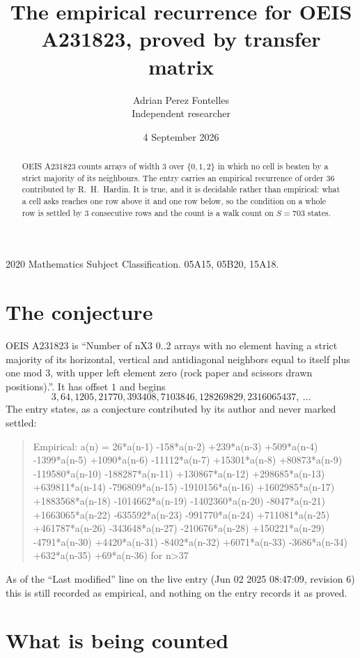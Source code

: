 \documentclass[11pt,a4paper]{article}
\title{The empirical recurrence for OEIS A231823, proved by transfer matrix}
\author{Adrian Perez Fontelles\\ \small Independent researcher}
\date{4 September 2026}
\theoremstyle{plain}
\theoremstyle{definition}
\begin{document}
\maketitle

\begin{abstract}
OEIS A231823 counts arrays of width $3$ over $\{0,1,2\}$ in which no cell is beaten by a strict majority of its neighbours. The entry carries an
empirical recurrence of order $36$ contributed by R.~H.~Hardin. It is true, and it is
decidable rather than empirical: what a cell asks reaches one row above
it and one row below, so the condition on a whole row is settled by
$3$ consecutive rows and the count is a walk count on $S=703$ states.
\end{abstract}

\noindent\small 2020 Mathematics Subject Classification. 05A15, 05B20, 15A18.\normalsize

\section{The conjecture}

OEIS A231823 is ``Number of nX3 0..2 arrays with no element having a strict majority of its horizontal, vertical and antidiagonal neighbors equal to itself plus one mod 3, with upper left element zero (rock paper and scissors drawn positions).''. It has offset $1$ and begins
\[
3, 64, 1205, 21770, 393408, 7103846, 128269829, 2316065437,\ \dots
\]
The entry states, as a conjecture contributed by its author and never marked settled:
\begin{quote}
Empirical: a(n) = 26*a(n-1) -158*a(n-2) +239*a(n-3) +509*a(n-4) -1399*a(n-5) +1090*a(n-6) -11112*a(n-7) +15301*a(n-8) +80873*a(n-9) -119580*a(n-10) -188287*a(n-11) +130867*a(n-12) +298685*a(n-13) +639811*a(n-14) -796809*a(n-15) -1910156*a(n-16) +1602985*a(n-17) +1883568*a(n-18) -1014662*a(n-19) -1402360*a(n-20) -8047*a(n-21) +1663065*a(n-22) -635592*a(n-23) -991770*a(n-24) +711081*a(n-25) +461787*a(n-26) -343648*a(n-27) -210676*a(n-28) +150221*a(n-29) -4791*a(n-30) +4420*a(n-31) -8402*a(n-32) +6071*a(n-33) -3686*a(n-34) +632*a(n-35) +69*a(n-36) for n>37
\end{quote}
As of the ``Last modified'' line on the live entry (Jun 02 2025 08:47:09, revision 6) this is still
recorded as empirical, and nothing on the entry records it as proved.

\section{What is being counted}
\end{document}
